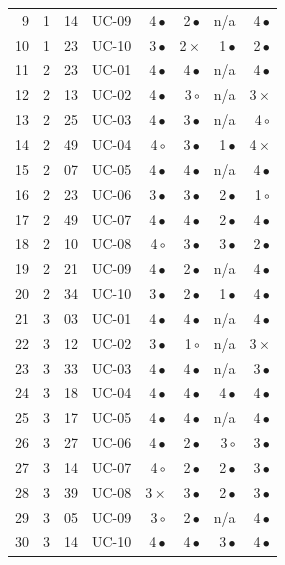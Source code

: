 \begin{longtable}{@{}rrrl rrrr@{}}
9 & 1 & 14 & UC-09 & 4\,$\bullet$ & 2\,$\bullet$ & n/a & 4\,$\bullet$ \\
10 & 1 & 23 & UC-10 & 3\,$\bullet$ & 2\,$\times$ & 1\,$\bullet$ & 2\,$\bullet$ \\
\midrule
11 & 2 & 23 & UC-01 & 4\,$\bullet$ & 4\,$\bullet$ & n/a & 4\,$\bullet$ \\
12 & 2 & 13 & UC-02 & 4\,$\bullet$ & 3\,$\circ$ & n/a & 3\,$\times$ \\
13 & 2 & 25 & UC-03 & 4\,$\bullet$ & 3\,$\bullet$ & n/a & 4\,$\circ$ \\
14 & 2 & 49 & UC-04 & 4\,$\circ$ & 3\,$\bullet$ & 1\,$\bullet$ & 4\,$\times$ \\
15 & 2 & 07 & UC-05 & 4\,$\bullet$ & 4\,$\bullet$ & n/a & 4\,$\bullet$ \\
16 & 2 & 23 & UC-06 & 3\,$\bullet$ & 3\,$\bullet$ & 2\,$\bullet$ & 1\,$\circ$ \\
17 & 2 & 49 & UC-07 & 4\,$\bullet$ & 4\,$\bullet$ & 2\,$\bullet$ & 4\,$\bullet$ \\
18 & 2 & 10 & UC-08 & 4\,$\circ$ & 3\,$\bullet$ & 3\,$\bullet$ & 2\,$\bullet$ \\
19 & 2 & 21 & UC-09 & 4\,$\bullet$ & 2\,$\bullet$ & n/a & 4\,$\bullet$ \\
20 & 2 & 34 & UC-10 & 3\,$\bullet$ & 2\,$\bullet$ & 1\,$\bullet$ & 4\,$\bullet$ \\
\midrule
21 & 3 & 03 & UC-01 & 4\,$\bullet$ & 4\,$\bullet$ & n/a & 4\,$\bullet$ \\
22 & 3 & 12 & UC-02 & 3\,$\bullet$ & 1\,$\circ$ & n/a & 3\,$\times$ \\
23 & 3 & 33 & UC-03 & 4\,$\bullet$ & 4\,$\bullet$ & n/a & 3\,$\bullet$ \\
24 & 3 & 18 & UC-04 & 4\,$\bullet$ & 4\,$\bullet$ & 4\,$\bullet$ & 4\,$\bullet$ \\
25 & 3 & 17 & UC-05 & 4\,$\bullet$ & 4\,$\bullet$ & n/a & 4\,$\bullet$ \\
26 & 3 & 27 & UC-06 & 4\,$\bullet$ & 2\,$\bullet$ & 3\,$\circ$ & 3\,$\bullet$ \\
27 & 3 & 14 & UC-07 & 4\,$\circ$ & 2\,$\bullet$ & 2\,$\bullet$ & 3\,$\bullet$ \\
28 & 3 & 39 & UC-08 & 3\,$\times$ & 3\,$\bullet$ & 2\,$\bullet$ & 3\,$\bullet$ \\
29 & 3 & 05 & UC-09 & 3\,$\circ$ & 2\,$\bullet$ & n/a & 4\,$\bullet$ \\
30 & 3 & 14 & UC-10 & 4\,$\bullet$ & 4\,$\bullet$ & 3\,$\bullet$ & 4\,$\bullet$ \\

\end{longtable}
